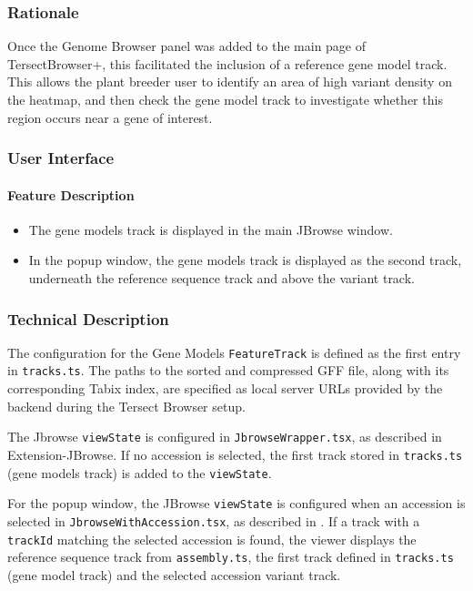 \documentclass[12pt]{article}
\begin{document}
\subsubsection{Rationale}
Once the Genome Browser panel was added to the main page of TersectBrowser+, this facilitated the inclusion of a reference gene model track. This allows the plant breeder user to identify an area of high variant density on the heatmap, and then check the gene model track to investigate whether this region occurs near a gene of interest.

\subsubsection{User Interface}
\paragraph{Feature Description}
\begin{itemize}
    \item The gene models track is displayed in the main JBrowse window. 
    \item In the popup window, the gene models track is displayed as the second track, underneath the reference sequence track and above the variant track.
\end{itemize}

\subsubsection{Technical Description}
The configuration for the Gene Models \verb+FeatureTrack+ is defined as the first entry in \verb+tracks.ts+. The paths to the sorted and compressed GFF file, along with its corresponding Tabix index, are specified as local server URLs provided by the backend during the Tersect Browser setup. 

The Jbrowse \verb+viewState+ is configured in \verb+JbrowseWrapper.tsx+, as described in Extension-JBrowse. If no accession is selected, the first track stored in \verb+tracks.ts+ (gene models track) is added to the \verb+viewState+.

For the popup window, the JBrowse \verb+viewState+ is configured when an accession is selected in \verb+JbrowseWithAccession.tsx+, as described in . If a track with a \verb+trackId+ matching the selected accession is found, the viewer displays the reference sequence track from \verb+assembly.ts+, the first track defined in \verb+tracks.ts+ (gene model track) and the selected accession variant track. 
\end{document}
